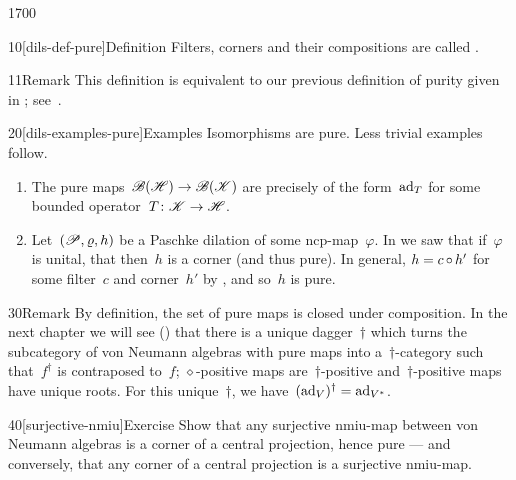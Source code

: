 \begin{parsec}{1700}%
\begin{point}{10}[dils-def-pure]{Definition}%
    Filters, corners and their compositions are called .
\begin{point}{11}{Remark}%
This definition is equivalent to our previous definition
    of purity given in \cite[dfn.~21]{wwpaschke};
    see~.
\end{point}
\end{point}
\begin{point}{20}[dils-examples-pure]{Examples}%
Isomorphisms are pure.  Less trivial examples follow.
\begin{enumerate}
\item
The pure maps~$\mathscr{B}(\mathscr{H}) \to \mathscr{B}(\mathscr{K})$
    are precisely of the form~$\mathrm{ad}_T$
    for some bounded operator~$T\colon \mathscr{K} \to \mathscr{H}$.
\item
Let~$(\mathscr{P}, \varrho, h)$ be a Paschke dilation of some ncp-map~$\varphi$.
In  we saw that if~$\varphi$ is unital,
        that then~$h$ is a corner (and thus pure).
In general, $h = c \mathop{\circ} h'$ for some filter~$c$ and corner~$h'$
    by ,
        and so~$h$ is pure.
\end{enumerate}
\spacingfix{}
\end{point}
\begin{point}{30}{Remark}%
By definition, the set of pure maps is closed under composition.
In the next chapter we will see () that
    there is a unique dagger~$\dagger$
    which turns the subcategory of von Neumann
    algebras with pure maps into a~$\dagger$-category
    such that~$f^\dagger$ is contraposed to~$f$;
            $\diamond$-positive maps are~$\dagger$-positive
            and~$\dagger$-positive maps have unique roots.
For this unique~$\dagger$, we have~$(\mathrm{ad}_V)^\dagger = \mathrm{ad}_{V^*}$.
\end{point}
\begin{point}{40}[surjective-nmiu]{Exercise}%
Show that any surjective nmiu-map between von Neumann algebras
        is a corner of a central projection, hence pure
        --- and conversely,
        that any corner of a central projection is a surjective nmiu-map.
\end{point}
\end{parsec}

